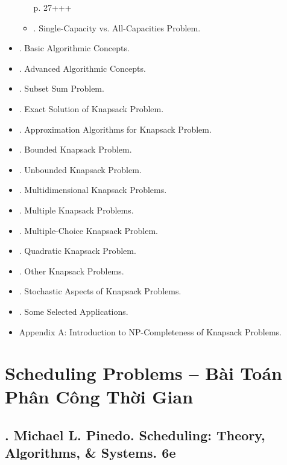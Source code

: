 \documentclass{article}
\begin{document}
\begin{itemize}
\begin{itemize}
        p. 27+++
        \item {. Single-Capacity vs. All-Capacities Problem.}
    \end{itemize}
    \item {. Basic Algorithmic Concepts.}
    \item {. Advanced Algorithmic Concepts.}
    \item {. Subset Sum Problem.}
    \item {. Exact Solution of Knapsack Problem.}
    \item {. Approximation Algorithms for Knapsack Problem.}
    \item {. Bounded Knapsack Problem.}
    \item {. Unbounded Knapsack Problem.}
    \item {. Multidimensional Knapsack Problems.}
    \item {. Multiple Knapsack Problems.}
    \item {. Multiple-Choice Knapsack Problem.}
    \item {. Quadratic Knapsack Problem.}
    \item {. Other Knapsack Problems.}
    \item {. Stochastic Aspects of Knapsack Problems.}
    \item {. Some Selected Applications.}
    \item {\sf Appendix A: Introduction to NP-Completeness of Knapsack Problems.}
\end{itemize}



\section{Scheduling Problems -- Bài Toán Phân Công Thời Gian}


\subsection{\cite{Pinedo2022}. {\sc Michael L. Pinedo}. Scheduling: Theory, Algorithms, \& Systems. 6e}
\end{document}
